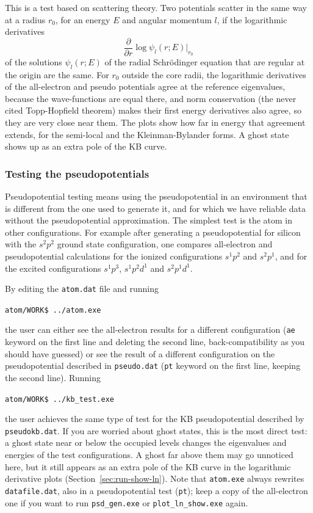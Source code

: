\documentclass[11pt]{article}
\begin{document}
This is a test based on scattering theory.  Two potentials scatter in the same way at a
radius $r_0$, for an energy $E$ and angular momentum $l$, if the logarithmic derivatives
\begin{equation}
\frac{\partial}{\partial r}\log\psi_l(r;E)\Big|_{r_0}
\end{equation}
of the solutions $\psi_l(r;E)$ of the radial Schr\"odinger equation that are regular at
the origin are the same.  For $r_0$ outside the core radii, the logarithmic derivatives
of the all-electron and pseudo potentials agree at the reference eigenvalues, because the
wave-functions are equal there, and norm conservation (the never cited Topp-Hopfield theorem)
makes their first energy derivatives also agree, so they are very close near them.
The plots show how far in energy that agreement extends, for the semi-local and the
Kleinman-Bylander forms.  A ghost state shows up as an extra pole of the KB curve.


\subsubsection{Testing the pseudopotentials}
\label{sec:run-test}

Pseudopotential testing means using the pseudopotential in an environment that is
different from the one used to generate it, and for which we have reliable data without
the pseudopotential approximation.  The simplest test is the atom in other configurations.
For example after generating a pseudopotential for silicon with the $s^2p^2$
ground state configuration, one compares all-electron and pseudopotential calculations for
the ionized configurations $s^1p^2$ and $s^2p^1$, and for the excited configurations
$s^1p^3$, $s^1p^2d^1$ and $s^2p^1d^1$.

By editing the \texttt{atom.dat} file and running

\noindent\texttt{atom/WORK\$ ../atom.exe}

the user can either see the all-electron results for a
different configuration (\texttt{ae} keyword on the first line and deleting the second line, back-compatibility
as you should have guessed) or see the result of a different configuration on the pseudopotential
described in \texttt{pseudo.dat} (\texttt{pt} keyword on the first line, keeping the second line).  Running

\noindent\texttt{atom/WORK\$ ../kb{\_}test.exe}

the user achieves the same type of test for the KB pseudopotential described by \texttt{pseudokb.dat}.
If you are worried about ghost states, this is the most direct test: a ghost state near
or below the occupied levels changes the eigenvalues and energies of the test configurations.
A ghost far above them may go unnoticed here, but it still appears as an extra pole
of the KB curve in the logarithmic derivative plots (Section~\ref{sec:run-show-ln}).
Note that \texttt{atom.exe} always rewrites \texttt{datafile.dat}, also in a
pseudopotential test (\texttt{pt}); keep a copy of the all-electron one if you
want to run \texttt{psd\_gen.exe} or \texttt{plot\_ln\_show.exe} again.
\end{document}
